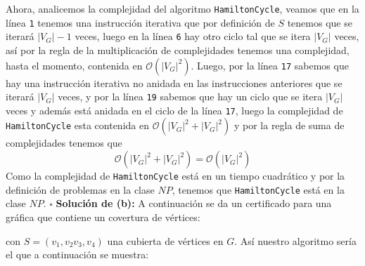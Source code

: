 \documentclass{article}
\newcommand{\code}[1]{\textcolor{white!25!black}{\texttt{#1}}}
\begin{document}
Ahora, analicemos la complejidad del algoritmo \code{HamiltonCycle}, veamos que en la
l\'inea \code{1} tenemos una instrucci\'on iterativa que por definici\'on de $S$ tenemos
que se iterar\'a $|V_G| - 1$ veces, luego en la l\'inea \code{6} hay otro ciclo tal que
se itera $|V_G|$ veces, as\'i por la regla de la multiplicaci\'on de complejidades tenemos
una complejidad, hasta el momento, contenida en $\mathcal{O}(|V_G|^2)$.
Luego, por la l\'inea \code{17} sabemos que hay una instrucci\'on iterativa no anidada en
las instrucciones anteriores que se iterar\'a $|V_G|$ veces, y por la l\'inea \code{19}
sabemos que hay un ciclo que se itera $|V_G|$ veces y adem\'as est\'a anidada en el ciclo
de la l\'inea \code{17}, luego la complejidad de \code{HamiltonCycle} esta contenida en
$\mathcal{O}(|V_G|^2 + |V_G|^2)$ y por la regla de suma de complejidades tenemos que
\[
\mathcal{O}(|V_G|^2 + |V_G|^2) = \mathcal{O}(|V_G|^2)
\]
Como la complejidad de \code{HamiltonCycle} est\'a en un tiempo cuadr\'atico y por la definici\'on
de problemas en la clase $NP$, tenemos que \code{HamiltonCycle} est\'a en la clase $NP$. \hfill $\square$
\newpage
\textbf{Soluci\'on de (b):}
A continuaci\'on se da un certificado para una gr\'afica que contiene un covertura de v\'ertices:
\begin{figure}[ht!]
  \centering
\end{figure}

con $S = (v_1,v_2v_3,v_4)$ una cubierta de v\'ertices en $G$. As\'i
nuestro algoritmo ser\'ia el que a continuaci\'on se muestra:
\end{document}
